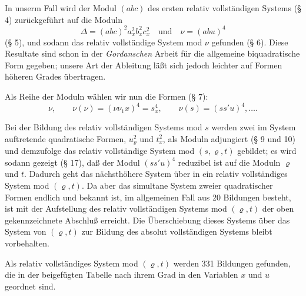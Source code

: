 In unserm Fall wird der Modul $(abc)$ des ersten relativ vollständigen Systems (§ 4) zurückgeführt auf die Moduln
\[
\Delta=(abc)^2a_x^2b_x^2c_x^2\quad\text{und}\quad \nu=(abu)^4
\]
(§ 5), und sodann das relativ vollständige System mod $\nu$ gefunden (§ 6). Diese Resultate sind schon in der \emph{Gordanschen} Arbeit für die allgemeine biquadratische Form gegeben; unsere Art der Ableitung läßt sich jedoch leichter auf Formen höheren Grades übertragen.

Als Reihe der Moduln wählen wir nun die Formen (§ 7):
\[
\nu,\qquad \nu(\nu)=(\nu\nu_1x)^4=s_x^4,\qquad \nu(s)=(ss'u)^4,\ldots .
\]

Bei der Bildung des relativ vollständigen Systems mod $s$ werden zwei im System auftretende quadratische Formen, $u_\varrho^2$ und $t_x^2$, als Moduln adjungiert (§ 9 und 10) und demzufolge das relativ vollständige System mod $(s,\varrho,t)$ gebildet; es wird sodann gezeigt (§ 17), daß der Modul $(ss'u)^4$ reduzibel ist auf die Moduln $\varrho$ und $t$. Dadurch geht das nächsthöhere System über in ein relativ vollständiges System mod $(\varrho,t)$. Da aber das simultane System zweier quadratischer Formen endlich und bekannt ist, im allgemeinen Fall aus 20 Bildungen besteht, ist mit der Aufstellung des relativ vollständigen Systems mod $(\varrho,t)$ der oben gekennzeichnete Abschluß erreicht. Die Überschiebung dieses Systems über das System von $(\varrho,t)$ zur Bildung des absolut vollständigen Systems bleibt vorbehalten.

Als relativ vollständiges System mod $(\varrho,t)$ werden 331 Bildungen gefunden, die in der beigefügten Tabelle nach ihrem Grad in den Variablen $x$ und $u$ geordnet sind.

